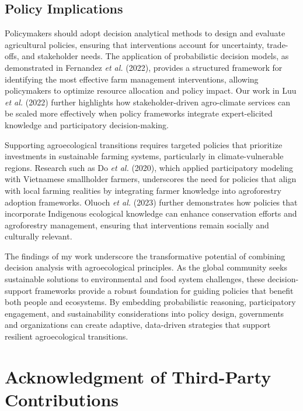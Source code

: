 \documentclass[
]{article}
\begin{document}
\hypertarget{policy-implications}{%
\subsection{Policy Implications}\label{policy-implications}}

Policymakers should adopt decision analytical methods to design and
evaluate agricultural policies, ensuring that interventions account for
uncertainty, trade-offs, and stakeholder needs. The application of
probabilistic decision models, as demonstrated in Fernandez \emph{et
al.} (2022), provides a structured framework for identifying the most
effective farm management interventions, allowing policymakers to
optimize resource allocation and policy impact. Our work in Luu \emph{et
al.} (2022) further highlights how stakeholder-driven agro-climate
services can be scaled more effectively when policy frameworks integrate
expert-elicited knowledge and participatory decision-making.

Supporting agroecological transitions requires targeted policies that
prioritize investments in sustainable farming systems, particularly in
climate-vulnerable regions. Research such as Do \emph{et al.} (2020),
which applied participatory modeling with Vietnamese smallholder
farmers, underscores the need for policies that align with local farming
realities by integrating farmer knowledge into agroforestry adoption
frameworks. Oluoch \emph{et al.} (2023) further demonstrates how
policies that incorporate Indigenous ecological knowledge can enhance
conservation efforts and agroforestry management, ensuring that
interventions remain socially and culturally relevant.

The findings of my work underscore the transformative potential of
combining decision analysis with agroecological principles. As the
global community seeks sustainable solutions to environmental and food
system challenges, these decision-support frameworks provide a robust
foundation for guiding policies that benefit both people and ecosystems.
By embedding probabilistic reasoning, participatory engagement, and
sustainability considerations into policy design, governments and
organizations can create adaptive, data-driven strategies that support
resilient agroecological transitions.

\hypertarget{acknowledgment-of-third-party-contributions}{%
\section{Acknowledgment of Third-Party
Contributions}\label{acknowledgment-of-third-party-contributions}}
\end{document}
